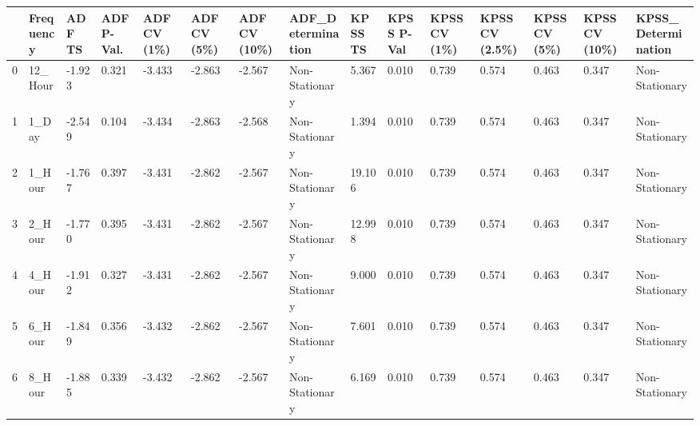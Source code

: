 \begin{tabular}{lllllllllllllll}
\toprule
 & Frequency & ADF TS & ADF P-Val. & ADF CV (1\%) & ADF CV (5\%) & ADF CV (10\%) & ADF_Determination & KPSS TS & KPSS P-Val & KPSS CV (1\%) & KPSS CV (2.5\%) & KPSS CV (5\%) & KPSS CV (10\%) & KPSS_Determination \\
\midrule
0 & 12_Hour & -1.923 & 0.321 & -3.433 & -2.863 & -2.567 & Non-Stationary & 5.367 & 0.010 & 0.739 & 0.574 & 0.463 & 0.347 & Non-Stationary \\
1 & 1_Day & -2.549 & 0.104 & -3.434 & -2.863 & -2.568 & Non-Stationary & 1.394 & 0.010 & 0.739 & 0.574 & 0.463 & 0.347 & Non-Stationary \\
2 & 1_Hour & -1.767 & 0.397 & -3.431 & -2.862 & -2.567 & Non-Stationary & 19.106 & 0.010 & 0.739 & 0.574 & 0.463 & 0.347 & Non-Stationary \\
3 & 2_Hour & -1.770 & 0.395 & -3.431 & -2.862 & -2.567 & Non-Stationary & 12.998 & 0.010 & 0.739 & 0.574 & 0.463 & 0.347 & Non-Stationary \\
4 & 4_Hour & -1.912 & 0.327 & -3.431 & -2.862 & -2.567 & Non-Stationary & 9.000 & 0.010 & 0.739 & 0.574 & 0.463 & 0.347 & Non-Stationary \\
5 & 6_Hour & -1.849 & 0.356 & -3.432 & -2.862 & -2.567 & Non-Stationary & 7.601 & 0.010 & 0.739 & 0.574 & 0.463 & 0.347 & Non-Stationary \\
6 & 8_Hour & -1.885 & 0.339 & -3.432 & -2.862 & -2.567 & Non-Stationary & 6.169 & 0.010 & 0.739 & 0.574 & 0.463 & 0.347 & Non-Stationary \\
\bottomrule
\end{tabular}
